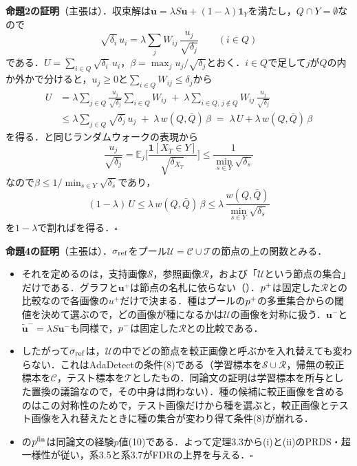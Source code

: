 \appblock
\textbf{命題2の証明}（主張は）．収束解は$\mathbf{u}=\lambda S\mathbf{u}+(1-\lambda)\mathbf{1}_Y$を満たし，$Q\cap Y=\emptyset$なので
\begin{equation*}
\sqrt{\delta_i}\,u_i=\lambda\sum_{j}W_{ij}\,\frac{u_j}{\sqrt{\delta_j}}\qquad(i\in Q)
\end{equation*}
である．$U=\sum_{i\in Q}\sqrt{\delta_i}\,u_i$，$\beta=\max_{j}u_j/\sqrt{\delta_j}$とおく．$i\in Q$で足して$j$が$Q$の内か外かで分けると，$u_j\ge0$と$\sum_{i\in Q}W_{ij}\le\delta_j$から
\begin{align*}
U&=\lambda\sum_{j\in Q}\frac{u_j}{\sqrt{\delta_j}}\sum_{i\in Q}W_{ij}\;+\;\lambda\sum_{i\in Q,\,j\notin Q}W_{ij}\,\frac{u_j}{\sqrt{\delta_j}}\\
&\le\lambda\sum_{j\in Q}\sqrt{\delta_j}\,u_j\;+\;\lambda\,w(Q,\bar{Q})\,\beta
\;=\;\lambda\,U+\lambda\,w(Q,\bar{Q})\,\beta
\end{align*}
を得る．と同じランダムウォークの表現から
\begin{equation*}
\frac{u_j}{\sqrt{\delta_j}}=\mathbb{E}_j\Big[\frac{\mathbf{1}[X_T\in Y]}{\sqrt{\delta_{X_T}}}\Big]\le\frac{1}{\min_{s\in Y}\sqrt{\delta_s}}
\end{equation*}
なので$\beta\le1/\min_{s\in Y}\sqrt{\delta_s}$であり，
\begin{equation*}
(1-\lambda)\,U\le\lambda\,w(Q,\bar{Q})\,\beta\le\lambda\,\frac{w(Q,\bar{Q})}{\min_{s\in Y}\sqrt{\delta_s}}
\end{equation*}
を$1-\lambda$で割ればを得る．$\square$

\appblock
\textbf{命題4の証明}（主張は）．$\sigma_{\mathrm{ref}}$をプール$\mathcal{U}=\mathcal{C}\cup\mathcal{T}$の節点の上の関数とみる．
\begin{itemize}
\item[(1)] それを定めるのは，支持画像$\mathcal{S}$，参照画像$\mathcal{R}$，および「$\mathcal{U}$という節点の集合」だけである．グラフと$\mathbf{u}^{+}$は節点の名札に依らない（）．$p^{+}$は固定した$\mathcal{R}$との比較なので各画像の$u^{+}$だけで決まる．種はプールの$p^{+}$の多重集合からの閾値を決めて選ぶので，どの画像が種になるかは$\mathcal{U}$の画像を対称に扱う．$\mathbf{u}^{-}$と$\tilde{\mathbf{u}}^{-}=\lambda S\mathbf{u}^{-}$も同様で，$p^{-}$は固定した$\mathcal{R}$との比較である．
\item[(2)] したがって$\sigma_{\mathrm{ref}}$は，$\mathcal{U}$の中でどの節点を較正画像と呼ぶかを入れ替えても変わらない．これはAdaDetectの条件(8)である（学習標本を$\mathcal{S}\cup\mathcal{R}$，帰無の較正標本を$\mathcal{C}$，テスト標本を$\mathcal{T}$としたもの．同論文の証明は学習標本を所与とした置換の議論なので，その中身は問わない）．種の候補に較正画像を含めるのはこの対称性のためで，テスト画像だけから種を選ぶと，較正画像とテスト画像を入れ替えたときに種の集合が変わり得て条件(8)が崩れる．
\item[(3)] の$p^{\mathrm{fin}}$は同論文の経験$p$値(10)である．よって定理3.3から(i)と(ii)のPRDS・超一様性が従い，系3.5と系3.7がFDRの上界を与える．$\square$
\end{itemize}

